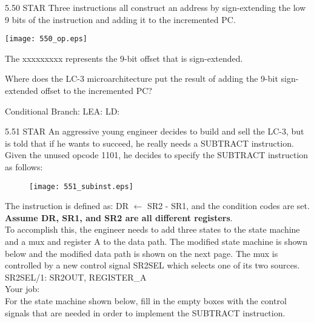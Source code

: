 \documentclass{patt}
\begin{document}
\begin{exercises}
\item[5.50]STAR Three instructions all construct an address by
sign-extending the low 9 bits of the instruction and adding it to
the incremented PC. \\

\begin{center}
\texttt{[image: 550\_op.eps]}
\end{center}

\vspace{.1in}
\noindent
The xxxxxxxxx represents the 9-bit offset that is sign-extended.

\vspace{.1in}
\noindent
Where does the LC-3 microarchitecture put the result of adding
the 9-bit sign-extended offset to the incremented PC?

\vspace{.1in}
Conditional Branch: 
LEA: 
LD: 

\FloatBarrier

\item[5.51]STAR An aggressive young engineer decides to build and sell the LC-3, but is told that if he wants to succeed, he really needs a SUBTRACT instruction.
Given the unused opcode 1101, he decides to specify the SUBTRACT instruction as follows:

\begin{figure}[h]
\centering
\texttt{[image: 551\_subinst.eps]}
\end{figure}

\noindent
The instruction is defined as:   DR $\leftarrow$ SR2 - SR1, and the condition codes are set. \textbf{Assume DR, SR1, and SR2 are all different registers}. \\

\noindent
To accomplish this, the engineer needs to add three states to the state machine
and a mux and register A to the data path.  The modified state machine is shown below and the modified data path is shown on the next page.  The mux is
controlled by a new control signal SR2SEL which selects one of its two
sources. \\

SR2SEL/1:    SR2OUT, REGISTER\_A\\

\noindent
Your job: \\

\noindent
For the state machine shown below, fill in the empty boxes with the control signals that
are needed in order to implement the SUBTRACT instruction. \\


\end{exercises}
\end{document}
